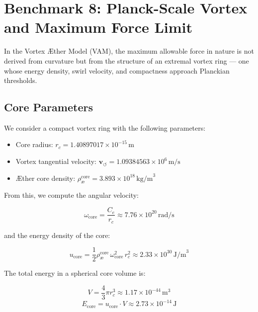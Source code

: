 \section{Benchmark 8: Planck-Scale Vortex and Maximum Force Limit}

In the Vortex Æther Model (VAM), the maximum allowable force in nature is not derived from curvature but from the structure of an extremal vortex ring — one whose energy density, swirl velocity, and compactness approach Planckian thresholds.

\subsection{Core Parameters}

We consider a compact vortex ring with the following parameters:

\begin{itemize}
    \item Core radius: \( r_c = 1.40897017 \times 10^{-15} \, \text{m} \)
    \item Vortex tangential velocity: \( \mathbf{v}_{\scriptscriptstyle\boldsymbol{\circlearrowleft}} = 1.09384563 \times 10^{6} \, \text{m/s} \)
    \item Æther core density: \( \rho_\text{\ae}^\text{core} = 3.893 \times 10^{18} \, \text{kg/m}^3 \)
\end{itemize}

From this, we compute the angular velocity:

\begin{equation}
\omega_{\text{core}} = \frac{C_e}{r_c} \approx 7.76 \times 10^{20} \, \text{rad/s}
\end{equation}

and the energy density of the core:

\begin{equation}
u_{\text{core}} = \frac{1}{2} \rho_\text{\ae}^\text{core} \, \omega_{\text{core}}^2 \, r_c^2 \approx 2.33 \times 10^{30} \, \text{J/m}^3
\end{equation}

The total energy in a spherical core volume is:

\begin{equation}
V = \frac{4}{3} \pi r_c^3 \approx 1.17 \times 10^{-44} \, \text{m}^3
\end{equation}
\begin{equation}
E_{\text{core}} = u_{\text{core}} \cdot V \approx 2.73 \times 10^{-14} \, \text{J}
\end{equation}

